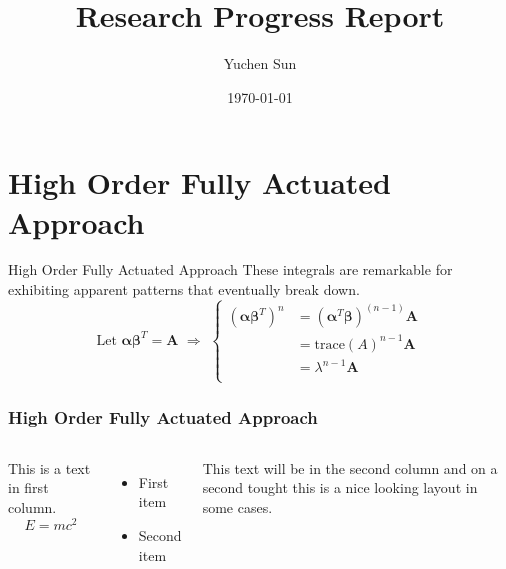 \documentclass{beamer}
\title{Research Progress Report}
\author{Yuchen Sun}
\institute{Ocean University of China}
\date{\today}
\begin{document}
\maketitle
\footnotesize
\begin{frame}
    \tableofcontents
\end{frame}
\section{High Order Fully Actuated Approach}
\begin{frame}{High Order Fully Actuated Approach}
    \footnotesize
    These integrals are remarkable for exhibiting apparent patterns that eventually break down.
    \[
\text{Let }\boldsymbol{\alpha}\boldsymbol{\beta}^T=\boldsymbol{A}\,\,\Rightarrow\,\,\left\{\begin{aligned}
(\boldsymbol{\alpha}\boldsymbol{\beta}^T)^n&=(\boldsymbol{\alpha}^T\boldsymbol{\beta})^{(n-1)}\boldsymbol{A}\\
&=\text{trace}(A)^{n-1}\boldsymbol{A}\\
&=\lambda^{n-1}\boldsymbol{A}\\
\end{aligned}\right.
     \]
\end{frame}

\begin{frame}
\frametitle{High Order Fully Actuated Approach}
\begin{columns}
This is a text in first column.
$$E=mc^2$$
\begin{itemize}
\item First item
\item Second item
\end{itemize}

This text will be in the second column
and on a second tought this is a nice looking
layout in some cases.
\end{columns}
\end{frame}
\end{document}
